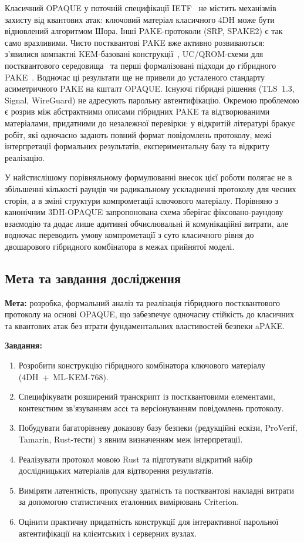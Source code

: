 \documentclass{llncs}
\newcommand{\acct}{\mathsf{acct}}
\begin{document}
Класичний OPAQUE у поточній специфікації IETF~\cite{ietf-opaque} не
містить механізмів захисту від квантових атак: ключовий матеріал
класичного 4DH може бути відновлений алгоритмом Шора. Інші
PAKE-протоколи (SRP, SPAKE2) є так само вразливими. Чисто постквантові
PAKE вже активно розвиваються: з'явилися компактні KEM-базовані
конструкції~\cite{arriaga2024}, UC/QROM-схеми для постквантового
середовища~\cite{lyu2024uc} та перші формалізовані підходи до
гібридного PAKE~\cite{hesse2024,lyu2024hybrid}. Водночас ці результати
ще не привели до усталеного стандарту асиметричного PAKE на кшталт OPAQUE.
Існуючі гібридні рішення (TLS~1.3, Signal, WireGuard) не адресують
парольну автентифікацію. Окремою проблемою є розрив між абстрактними
описами гібридних PAKE та відтворюваними матеріалами, придатними до
незалежної перевірки: у відкритій літературі бракує робіт, які одночасно
задають повний формат повідомлень протоколу, межі інтерпретації формальних
результатів, експериментальну базу та відкриту реалізацію.

У найстислішому порівняльному формулюванні внесок цієї роботи полягає не
в збільшенні кількості раундів чи радикальному ускладненні протоколу для
чесних сторін, а в зміні структури компрометації ключового матеріалу.
Порівняно з канонічним 3DH-OPAQUE запропонована схема зберігає
фіксовано-раундову взаємодію та додає лише адитивні обчислювальні й
комунікаційні витрати, але водночас переводить умову компрометації з
суто класичного рівня до двошарового гібридного комбінатора в межах
прийнятої моделі.

\subsection{Мета та завдання дослідження}

\textbf{Мета:} розробка, формальний аналіз та реалізація гібридного
постквантового протоколу на основі OPAQUE, що забезпечує одночасну
стійкість до класичних та квантових атак без втрати фундаментальних
властивостей безпеки aPAKE.

\textbf{Завдання:}
\begin{enumerate}
  \item Розробити конструкцію гібридного комбінатора ключового матеріалу
        (4DH~+~ML-KEM-768).
  \item Специфікувати розширений транскрипт із постквантовими
        елементами, контекстним зв'язуванням $\acct$ та
        версіонуванням повідомлень протоколу.
  \item Побудувати багаторівневу доказову базу безпеки
        (редукційні ескізи, ProVerif, Tamarin, Rust-тести) з явним
        визначенням меж інтерпретації.
  \item Реалізувати протокол мовою Rust та підготувати відкритий набір
        дослідницьких матеріалів для відтворення результатів.
  \item Виміряти латентність, пропускну здатність та постквантові накладні
        витрати за допомогою статистичних еталонних вимірювань
        Criterion.
  \item Оцінити практичну придатність конструкції для інтерактивної
        парольної автентифікації на клієнтських і серверних вузлах.
\end{enumerate}
\end{document}
